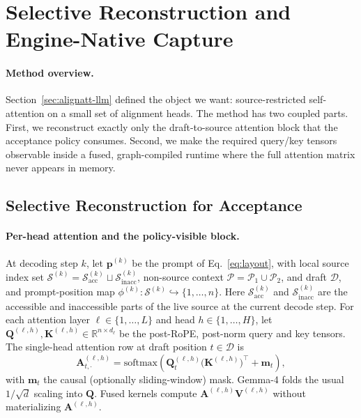 \documentclass[11pt,twocolumn]{article}
\begin{document}
\section{Selective Reconstruction and Engine-Native Capture}
\label{sec:qk-fast}
\label{sec:vllm}

\paragraph{Method overview.}
Section~\ref{sec:alignatt-llm} defined the object we want: source-restricted
self-attention on a small set of alignment heads. The method has two coupled
parts. First, we reconstruct exactly only the draft-to-source attention block
that the acceptance policy consumes. Second, we make the required query/key
tensors observable inside a fused, graph-compiled runtime where the full
attention matrix never appears in memory.

\subsection{Selective Reconstruction for Acceptance}

\paragraph{Per-head attention and the policy-visible block.}
At decoding step $k$, let $\mathbf{p}^{(k)}$ be the prompt of
Eq.~\eqref{eq:layout}, with local source index set
$\mathcal{S}^{(k)} = \mathcal{S}^{(k)}_{\mathrm{acc}} \sqcup
\mathcal{S}^{(k)}_{\mathrm{inacc}}$, non-source context
$\mathcal{P} = \mathcal{P}_1 \cup \mathcal{P}_2$, and draft
$\mathcal{D}$, and prompt-position map
$\phi^{(k)} : \mathcal{S}^{(k)} \hookrightarrow \{1,\ldots,n\}$. Here
$\mathcal{S}^{(k)}_{\mathrm{acc}}$ and
$\mathcal{S}^{(k)}_{\mathrm{inacc}}$ are the accessible and inaccessible parts
of the live source at the current decode step. For each attention layer
$\ell \in \{1,\ldots,L\}$ and head $h \in \{1,\ldots,H\}$, let
$\mathbf{Q}^{(\ell,h)}, \mathbf{K}^{(\ell,h)}
\in \mathbb{R}^{n \times d_\ell}$ be the post-RoPE, post-norm query and key
tensors. The single-head attention row at draft position $t \in \mathcal{D}$
is
\begin{equation}
  \mathbf{A}^{(\ell,h)}_{t,\cdot}
  = \mathrm{softmax}\!\left(
  \mathbf{Q}^{(\ell,h)}_t \bigl(\mathbf{K}^{(\ell,h)}\bigr)^{\!\top}
  + \mathbf{m}_t
  \right),
  \label{eq:softmax}
\end{equation}
with $\mathbf{m}_t$ the causal (optionally sliding-window) mask. Gemma-4
folds the usual $1/\sqrt{d}$ scaling into $\mathbf{Q}$. Fused kernels compute
$\mathbf{A}^{(\ell,h)} \mathbf{V}^{(\ell,h)}$ without materializing
$\mathbf{A}^{(\ell,h)}$.
\end{document}
